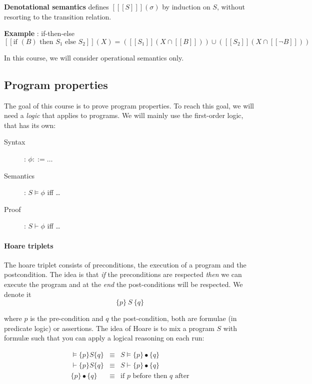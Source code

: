 \documentclass[12pt, a4paper]{book}
\begin{document}
\textbf{Denotational semantics} defines $[[[S]]](\sigma)$ by induction on $S$,
without resorting to the transition relation.

\begin{framed}
    \textbf{Example} : if-then-else
    $$
    [[\textrm{if } (B) \textrm{ then } S_{1} \textrm{ else } S_{2}]](X) =
    ([[S_{1}]] (X \cap [[B]])) \cup ([[S_{2}]] ( X \cap [[\lnot B]] ))
    $$
\end{framed}

In this course, we will consider operational semantics only.

\subsection{Program properties}
\label{sub:Program properties}

The goal of this course is to prove program properties. To reach this goal, we
will need a \textit{logic} that applies to programs. We will mainly use the
first-order logic, that has its own:

\begin{description}
    \item[Syntax]: $\phi ::= \ldots$
    \item[Semantics]: $S \vDash\phi$ iff \ldots
    \item[Proof]: $S \vdash\phi$ iff \ldots
\end{description}

\paragraph{Hoare triplets} The hoare triplet consists of preconditions, the
execution of a program and the postcondition. The idea is that \textit{if} the
preconditions are respected \textit{then} we can execute the program and at the
\textit{end} the post-conditions will be respected. We denote it
$$\{p\}\ S\ \{q\}$$

where $p$ is the pre-condition and $q$ the post-condition, both are formulae
(in predicate logic) or assertions. The idea of Hoare is to mix a program $S$
with formul\ae{} such that you can apply a logical reasoning on each run:

\begin{eqnarray}
    \vDash \{p\} S \{q\} & \equiv & S \vDash \{p\} \bullet \{q\} \\
    \vdash \{p\} S \{q\} & \equiv & S \vdash \{p\} \bullet \{q\} \\
    \{p\} \bullet \{q\} & \equiv & \textrm{if } p \textrm{ before then } q
    \textrm{ after}
\end{eqnarray}
\end{document}
